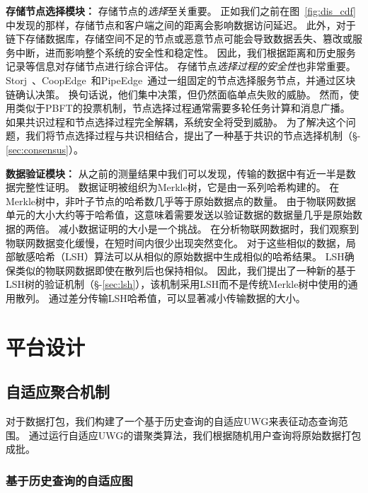 \textbf{存储节点选择模块：}
存储节点的\textit{选择}至关重要。
正如我们之前在图~\autoref{fig:dis_cdf}中发现的那样，存储节点和客户端之间的距离会影响数据访问延迟。
此外，对于链下存储数据库，存储空间不足的节点或恶意节点可能会导致数据丢失、篡改或服务中断，进而影响整个系统的安全性和稳定性。
因此，我们根据距离和历史服务记录等信息对存储节点进行综合评估。
存储节点\textit{选择过程的安全性}也非常重要。
Storj~\cite{storj2018storj}、CoopEdge~\cite{yuan2021coopedge}和PipeEdge~\cite{yuan2023pipeedge}通过一组固定的节点选择服务节点，并通过区块链确认决策。
换句话说，他们集中决策，但仍然面临单点失败的威胁。
然而，使用类似于PBFT的投票机制，节点选择过程通常需要多轮任务计算和消息广播。
如果共识过程和节点选择过程完全解耦，系统安全将受到威胁。
为了解决这个问题，我们将节点选择过程与共识相结合，提出了一种基于共识的节点选择机制（§-\ref{sec:consensus}）。

\textbf{数据验证模块：}
从之前的测量结果中我们可以发现，传输的数据中有近一半是数据完整性证明。
数据证明被组织为Merkle树，它是由一系列哈希构建的。
在Merkle树中，非叶子节点的哈希数几乎等于原始数据点的数量。
由于物联网数据单元的大小大约等于哈希值，这意味着需要发送以验证数据的数据量几乎是原始数据的两倍。
减小数据证明的大小是一个挑战。
在分析物联网数据时，我们观察到物联网数据变化缓慢，在短时间内很少出现突然变化。
对于这些相似的数据，局部敏感哈希（LSH）算法可以从相似的原始数据中生成相似的哈希结果。
LSH确保类似的物联网数据即使在散列后也保持相似。
因此，我们提出了一种新的基于LSH树的验证机制（§-\ref{sec:lsh}），该机制采用LSH而不是传统Merkle树中使用的通用散列。
通过差分传输LSH哈希值，可以显著减小传输数据的大小。

\chapter{平台设计}

\section{自适应聚合机制}
\label{sec:packaging}

对于数据打包，我们构建了一个基于历史查询的自适应UWG来表征动态查询范围。
通过运行自适应UWG的谱聚类算法，我们根据随机用户查询将原始数据打包成批。

\subsection{基于历史查询的自适应图}
\label{sec:UWG}


